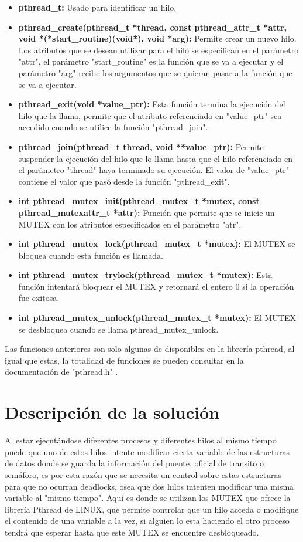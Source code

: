 \documentclass[16pt,a4papper]{article}
\begin{document}
	\begin{itemize}
		\item \textbf{pthread\_t:} Usado para identificar un hilo.
		\item \textbf{pthread\_create(pthread\_t *thread, const pthread\_attr\_t *attr,
			void *(*start\_routine)(void*), void *arg):} Permite crear un nuevo hilo. Los atributos que se desean utilizar para el hilo se especifican en el parámetro "attr", el parámetro "start\_routine" es la función que se va a ejecutar y el parámetro "arg" recibe los argumentos que se quieran pasar a la función que se va a ejecutar.
		\item \textbf{pthread\_exit(void *value\_ptr):} Esta función termina la ejecución del hilo que la llama, permite que el atributo referenciado en "value\_ptr" sea accedido cuando se utilice la función "pthread\_join".
		\item \textbf{pthread\_join(pthread\_t thread, void **value\_ptr):} Permite suspender la ejecución del hilo que lo llama hasta que el hilo referenciado en el parámetro "thread" haya terminado su ejecución. El valor de "value\_ptr" contiene el valor que pasó desde la función "pthread\_exit".
		\item \textbf{int pthread\_mutex\_init(pthread\_mutex\_t *mutex, const pthread\_mutexattr\_t *attr):} Función que permite que se inicie un MUTEX con los atributos especificados en el parámetro "atr".
		\item \textbf{int pthread\_mutex\_lock(pthread\_mutex\_t *mutex):} El MUTEX se bloquea cuando esta función es llamada.
		\item \textbf{int pthread\_mutex\_trylock(pthread\_mutex\_t *mutex):} Esta función intentará bloquear el MUTEX y retornará el entero 0 si la operación fue exitosa.
		\item \textbf{int pthread\_mutex\_unlock(pthread\_mutex\_t *mutex):} El MUTEX se desbloquea cuando se llama pthread\_mutex\_unlock.	
	\end{itemize}

	Las funciones anteriores son solo algunas de disponibles en la librería pthread, al igual que estas, la totalidad de funciones se pueden consultar en la documentación de "pthread.h" \cite{Pthread_documentation}. 

	\newpage
	\section{Descripción de la solución}
	
	Al estar ejecutándose diferentes procesos y diferentes hilos al mismo tiempo puede que uno de estos hilos intente modificar cierta variable de las estructuras de datos donde se guarda la información del puente, oficial de transito o semáforo, es por esta razón que se necesita un control sobre estas estructuras para que no ocurran deadlocks, osea que dos hilos intenten modificar una misma variable al "mismo tiempo". Aquí es donde se utilizan los MUTEX que ofrece la librería Pthread de LINUX, que permite controlar que un hilo acceda o modifique el contenido de una variable a la vez, si alguien lo esta haciendo el otro proceso tendrá que esperar hasta que este MUTEX se encuentre desbloqueado.
	
\end{document}

